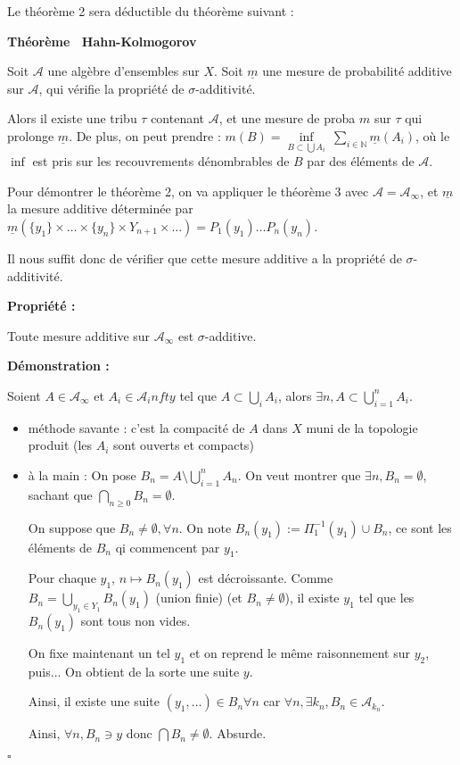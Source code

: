 \documentclass[10pt,a4paper,notitlepage ]{report}
\newcounter{th}
\newenvironment{theorem}[1][]{
\refstepcounter{th}
\begin{tcolorbox}
	\textbf{Théorème \theth \ #1}
	
	
}{\end{tcolorbox}}
\newenvironment{propriete}[1][]{
	\begin{tcolorbox}
		\textbf{Propriété #1 : }
}
{\end{tcolorbox}}
\newenvironment{demo}[1][]{

	\textbf{Démonstration #1 :}
}{\begin{flushright}
	$\square$
\end{flushright}
}
\begin{document}
Le théorème 2 sera déductible du théorème suivant :
\begin{theorem}[Hahn-Kolmogorov]
	Soit $\mathcal A$ une algèbre d'ensembles sur $X$. Soit $\underline m$ une mesure de probabilité additive sur $\mathcal A$, qui vérifie la propriété de $\sigma$-additivité.
	
	Alors il existe une tribu $\tau$ contenant $\mathcal A$, et une mesure de proba $m$ sur $\tau$ qui prolonge $\underline m$. De plus, on peut prendre : $m(B) = \underset{B \subset \bigcup A_i} \inf \  \underset{i \in \mathbb N}{\sum} \underline m (A_i)$, où le $\inf$ est pris sur les recouvrements dénombrables de $B$ par des éléments de $\mathcal A$.
\end{theorem}

Pour démontrer le théorème 2, on va appliquer le théorème 3 avec $\mathcal A = \mathcal A_\infty$, et $\underline m$ la mesure additive déterminée par $\underline m (\{y_1\}\times \dots \times \{y_n\} \times Y_{n+1} \times \dots) = P_1(y_1) \dots P_n(y_n)$.

Il nous suffit donc de vérifier que cette mesure additive a la propriété de $\sigma$-additivité.

\begin{propriete}
	Toute mesure additive sur $\mathcal A_\infty$ est $\sigma$-additive.
\end{propriete}

\begin{demo}
	Soient $A \in \mathcal A_\infty$ et $A_i \in \mathcal A_infty$ tel que $A \subset \underset i \bigcup A_i$, alors $\exists n, A \subset \bigcup_{i=1}^n A_i$.
	
	\begin{itemize}
		\item méthode savante : c'est la compacité de $A$ dans $X$ muni de la topologie produit (les $A_i$ sont ouverts et compacts)
		\item à la main :
		On pose $B_n = A \setminus \bigcup_{i=1}^n A_n$. On veut montrer que $\exists n, B_n = \emptyset$, sachant que $\underset {n\ge 0}\bigcap B_n = \emptyset$.
		
		On suppose que $B_n \ne \emptyset, \forall n$. On note $B_n(y_1) := \Pi_1^{-1}(y_1) \cup B_n$, ce sont les éléments de $B_n$ qi commencent par $y_1$.
		
		Pour chaque $y_1$, $n \mapsto B_n(y_1)$ est décroissante. Comme $B_n = \underset {y_1 \in Y_1} \bigcup B_n(y_1)$ (union finie) (et $B_n \ne \emptyset$), il existe $y_1$ tel que les $B_n(y_1)$ sont tous non vides.
		
		On fixe maintenant un tel $y_1$ et on reprend le même raisonnement sur $y_2$, puis... On obtient de la sorte une suite $y$.
		
		Ainsi, il existe une suite $(y_1, \dots) \in B_n \forall n$ car $\forall n, \exists k_n, B_n\in\mathcal A_{k_n}$.
		
		Ainsi, $\forall n, B_n \ni y$ donc $\bigcap B_n \ne \emptyset$. Absurde.
	\end{itemize}
\end{demo}
\end{document}
